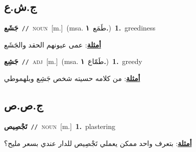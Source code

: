 \documentclass[10pt,a4paper,twoside]{article} %
\begin{document}
\begin{multicols}{2}
\vspace{-3mm}
\subsection*{\color{blue}\foreignlanguage{arabic}{ج.ش.ع}\color{blue}{}} 

{\setlength\topsep{0pt}\textbf{\foreignlanguage{arabic}{جَشَع}}\ {\color{gray}\texttt{//}\color{black}}\ \textsc{noun}\ [m.]\ \color{gray}(msa. \foreignlanguage{arabic}{طَمَع}~\foreignlanguage{arabic}{\textbf{١.}})\color{black}\ \textbf{1.}~greediness\  \begin{flushright}\color{gray}\foreignlanguage{arabic}{\textbf{\underline{\foreignlanguage{arabic}{أمثلة}}}: عمى عيونهم الحقد والجَشَع}\end{flushright}\color{black}} \vspace{2mm}

{\setlength\topsep{0pt}\textbf{\foreignlanguage{arabic}{جَشِع}}\ {\color{gray}\texttt{//}\color{black}}\ \textsc{adj}\ [m.]\ \color{gray}(msa. \foreignlanguage{arabic}{طَمّاع}~\foreignlanguage{arabic}{\textbf{١.}})\color{black}\ \textbf{1.}~greedy\  \begin{flushright}\color{gray}\foreignlanguage{arabic}{\textbf{\underline{\foreignlanguage{arabic}{أمثلة}}}: من كلامه حسيته شخص جَشِع وبلهموطي}\end{flushright}\color{black}} \vspace{2mm}

\vspace{-3mm}
\subsection*{\color{blue}\foreignlanguage{arabic}{ج.ص.ص}\color{blue}{}} 

{\setlength\topsep{0pt}\textbf{\foreignlanguage{arabic}{تَجْصِيص}}\ {\color{gray}\texttt{//}\color{black}}\ \textsc{noun}\ [m.]\ \textbf{1.}~plastering\  \begin{flushright}\color{gray}\foreignlanguage{arabic}{\textbf{\underline{\foreignlanguage{arabic}{أمثلة}}}: بتعرف واحد ممكن يعملي تَجْصِيص للدار عندي بسعر مليح؟}\end{flushright}\color{black}} \vspace{2mm}


\end{multicols}
\end{document}
